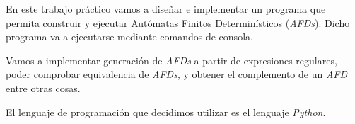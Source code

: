 En este trabajo práctico vamos a diseñar e implementar un programa que permita construir y ejecutar Autómatas Finitos Determinísticos (\emph{AFDs}). Dicho programa va a ejecutarse mediante comandos de consola.

Vamos a implementar generación de \emph{AFDs} a partir de expresiones regulares, poder comprobar equivalencia de \emph{AFDs}, y obtener el complemento de un \emph{AFD} entre otras cosas.

El lenguaje de programación que decidimos utilizar es el lenguaje \emph{Python}.